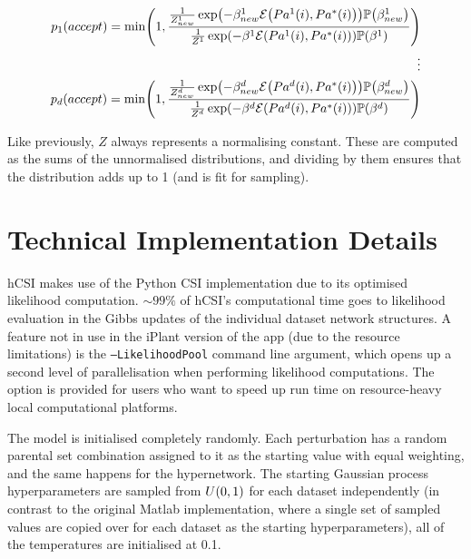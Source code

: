\documentclass{article}
\let\originalleft\left
\let\originalright\right
\renewcommand{\left}{\mathopen{}\mathclose\bgroup\originalleft}
\renewcommand{\right}{\aftergroup\egroup\originalright}
\begin{document}
\begin{enumerate}
\begin{equation*}
\begin{split}
p_1\left(accept\right) = \min\left(1,\frac{\frac{1}{Z_{new}^1}\exp\left( -\beta_{new}^1\mathcal{E}\left(Pa^1\left(i\right),Pa^*\left(i\right)\right) \right) \mathbb{P}\left(\beta_{new}^1\right)}{\frac{1}{Z^1}\exp\left( -\beta^1\mathcal{E}\left(Pa^1\left(i\right),Pa^*\left(i\right)\right) \right)\mathbb{P}\left(\beta^1\right)}\right) \\
\vdots \\
p_d\left(accept\right) = \min\left(1,\frac{\frac{1}{Z_{new}^d}\exp\left( -\beta_{new}^d\mathcal{E}\left(Pa^d\left(i\right),Pa^*\left(i\right)\right) \right) \mathbb{P}\left(\beta_{new}^d\right)}{\frac{1}{Z^d}\exp\left( -\beta^d\mathcal{E}\left(Pa^d\left(i\right),Pa^*\left(i\right)\right) \right)\mathbb{P}\left(\beta^d\right)}\right)
\end{split}
\end{equation*}
\end{enumerate}
Like previously, $Z$ always represents a normalising constant. These are computed as the sums of the unnormalised distributions, and dividing by them ensures that the distribution adds up to 1 (and is fit for sampling).

\section{Technical Implementation Details}

hCSI makes use of the Python CSI implementation due to its optimised likelihood computation. $\sim99\%$ of hCSI's computational time goes to likelihood evaluation in the Gibbs updates of the individual dataset network structures. A feature not in use in the iPlant version of the app (due to the resource limitations) is the \texttt{--LikelihoodPool} command line argument, which opens up a second level of parallelisation when performing likelihood computations. The option is provided for users who want to speed up run time on resource-heavy local computational platforms.

The model is initialised completely randomly. Each perturbation has a random parental set combination assigned to it as the starting value with equal weighting, and the same happens for the hypernetwork. The starting Gaussian process hyperparameters are sampled from $U\left(0,1\right)$ for each dataset independently (in contrast to the original Matlab implementation, where a single set of sampled values are copied over for each dataset as the starting hyperparameters), all of the temperatures are initialised at 0.1.
\end{document}
